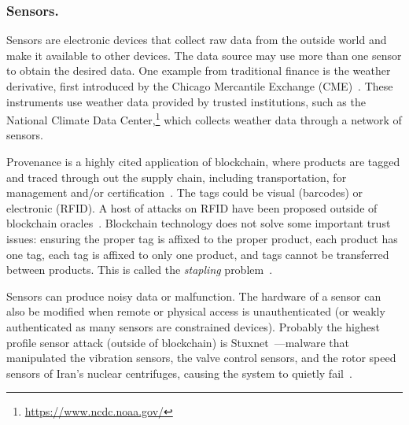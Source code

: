 



\subsubsection{Sensors.} Sensors are electronic devices that collect raw data from the outside world and make it available to other devices. The data source may use more than one sensor to obtain the desired data. One example from traditional finance is the weather derivative, first introduced by the Chicago Mercantile Exchange (CME)~\cite{muller2000weather}. These instruments use weather data provided by trusted institutions, such as the National Climate Data Center,\footnote{\url{https://www.ncdc.noaa.gov/}} which collects weather data through a network of sensors.

Provenance is a highly cited application of blockchain, where products are tagged and traced through out the supply chain, including transportation, for management and/or certification~\cite{tian2016agri,mondal2019blockchain,zelbst2019impact}. The tags could be visual (barcodes) or electronic (RFID). A host of attacks on RFID have been proposed outside of blockchain oracles~\cite{alizadeh2012survey}. Blockchain technology does not solve some important trust issues: ensuring the proper tag is affixed to the proper product, each product has one tag, each tag is affixed to only one product, and tags cannot be transferred between products. This is called the \textit{stapling} problem~\cite{RKYCC19}. 

Sensors can produce noisy data or malfunction. The hardware of a sensor can also be modified when remote or physical access is unauthenticated (or weakly authenticated as many sensors are constrained devices). Probably the highest profile sensor attack (outside of blockchain) is Stuxnet~\cite{langner2011stuxnet}---malware that manipulated the vibration sensors, the valve control sensors, and the rotor speed sensors of Iran's nuclear centrifuges, causing the system to quietly fail~\cite{stuxnetattack}.

